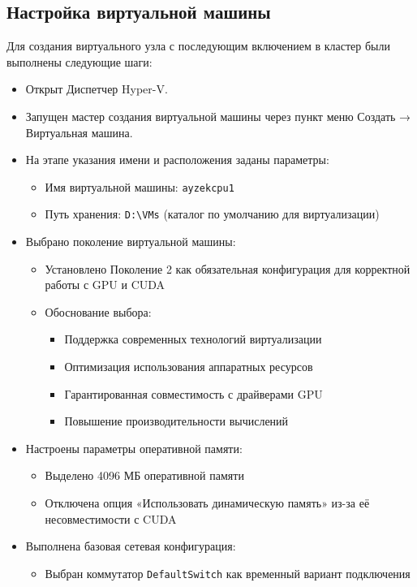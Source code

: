 \documentclass[areaset=advanced]{scrartcl}
\begin{document}
\subsection{Настройка виртуальной машины}
Для создания виртуального узла с последующим включением в кластер были выполнены следующие шаги:
\begin{itemize}
    \item Открыт Диспетчер Hyper-V.
    \item Запущен мастер создания виртуальной машины через пункт меню Создать → Виртуальная машина.
    \item На этапе указания имени и расположения заданы параметры:
    \begin{itemize}
        \item Имя виртуальной машины: \texttt{ayzekcpu1}
        \item Путь хранения: \texttt{D:\textbackslash VMs} (каталог по умолчанию для виртуализации)
    \end{itemize}
    \item Выбрано поколение виртуальной машины:
    \begin{itemize}
        \item Установлено Поколение 2 как обязательная конфигурация для корректной работы с GPU и CUDA
        \item Обоснование выбора:
        \begin{itemize}
            \item Поддержка современных технологий виртуализации
            \item Оптимизация использования аппаратных ресурсов
            \item Гарантированная совместимость с драйверами GPU
            \item Повышение производительности вычислений
        \end{itemize}
    \end{itemize}
    \item Настроены параметры оперативной памяти:
    \begin{itemize}
        \item Выделено 4096 МБ оперативной памяти
        \item Отключена опция «Использовать динамическую память» из-за её несовместимости с CUDA
    \end{itemize}
    \item Выполнена базовая сетевая конфигурация:
    \begin{itemize}
        \item Выбран коммутатор \texttt{DefaultSwitch} как временный вариант подключения

\end{itemize}
\end{itemize}
\end{document}
